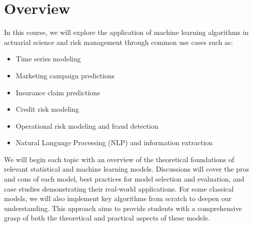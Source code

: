 \documentclass[a4paper, 12pt]{article}
\begin{document}
\section{Overview}
In this course, we will explore the application of machine learning algorithms in actuarial science and risk management through common use cases such as:
\begin{itemize}
    \item Time series modeling
    \item Marketing campaign predictions
    \item Insurance claim predictions
    \item Credit risk modeling
    \item Operational risk modeling and fraud detection
    \item Natural Language Processing (NLP) and information extraction
\end{itemize}
We will begin each topic with an overview of the theoretical foundations of relevant statistical and machine learning models. Discussions will cover the pros and cons of each model, best practices for model selection and evaluation, and case studies demonstrating their real-world applications. For some classical models, we will also implement key algorithms from scratch to deepen our understanding. This approach aims to provide students with a comprehensive grasp of both the theoretical and practical aspects of these models.
\end{document}
